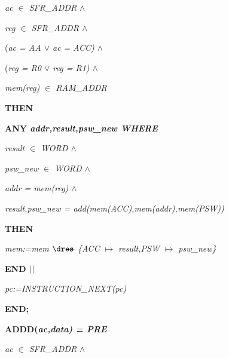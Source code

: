 \begin{sloppypar}
\hspace*{0.20in}\it ac $\in$  \it SFR\_ADDR  $\land$ 

\hspace*{0.20in}\it reg $\in$  \it SFR\_ADDR  $\land$ 

\hspace*{0.20in}\rm (\it ac \rm = \it AA  $\lor$  \it ac \rm = \it ACC\rm )  $\land$ 

\hspace*{0.20in}\rm (\it reg \rm = \it R0  $\lor$  \it reg \rm = \it R1\rm )  $\land$ 

\hspace*{0.20in}\it mem\rm (\it reg\rm ) $\in$  \it RAM\_ADDR

\hspace*{0.10in}\bf THEN

\hspace*{0.20in}\bf ANY \it addr\rm ,\it result\rm ,\it psw\_new \bf WHERE

\hspace*{0.30in}\it result $\in$  \it WORD  $\land$ 

\hspace*{0.30in}\it psw\_new $\in$  \it WORD  $\land$ 

\hspace*{0.30in}\it addr \rm = \it mem\rm (\it reg\rm )  $\land$ 

\hspace*{0.30in}\it result\rm ,\it psw\_new \rm = \it add\rm (\it mem\rm (\it ACC\rm )\rm ,\it mem\rm (\it addr\rm )\rm ,\it mem\rm (\it PSW\rm )\rm )

\hspace*{0.20in}\bf THEN

\hspace*{0.30in}\it mem\rm :=\it mem $\lover$ \rm \{\it ACC $\mapsto$ \it result\rm ,\it PSW $\mapsto$ \it psw\_new\rm \}

\hspace*{0.20in}\bf END  $\mbox{$\mid\mid$}$ 

\hspace*{0.20in}\it pc\rm :=\it INSTRUCTION\_NEXT\rm (\it pc\rm )

\hspace*{0.10in}\bf END\rm ;

\hspace*{0.10in}\bf ADDD\rm (\it ac\rm ,\it data\rm ) \rm = \bf PRE

\hspace*{0.20in}\it ac $\in$  \it SFR\_ADDR  $\land$ 


\end{sloppypar}
